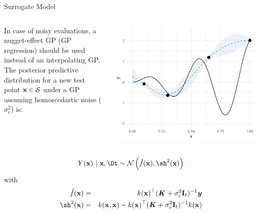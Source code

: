 \documentclass[11pt,compress,t,notes=noshow, xcolor=table]{beamer}
\begin{document}
\begin{vbframe}{Surrogate Model}

\begin{columns}[T]
\begin{column}{0.5\textwidth}
In case of noisy evaluations, a nugget-effect GP (GP regression) should be used instead of an interpolating GP.\\
\vspace{1em}
The posterior predictive distribution for a new test point $\mathbf{x} \in \mathcal{S}$ under a GP assuming homoscedastic noise ($\sigma_{\epsilon}^{2}$) is:
\end{column}
\begin{column}{0.5\textwidth}
\includegraphics[width = \textwidth]{figure_man/noisy_2.png}
\end{column}
\end{columns}

\vfill
\begin{eqnarray*}
  Y(\xv) ~|~ \xv, \Dt \sim \mathcal{N}\left(\fh(\xv), \sh^2(\xv)\right)
\end{eqnarray*}
with 
\begin{eqnarray*}
  \fh(\xv) &=& k(\xv)^\top (\bm{K} + \sigma_{\epsilon}^{2}\mathbf{I}_{t})^{-1} \bm{y} \\
  \sh^2(\xv) &=& k(\xv, \xv) - k(\xv)^\top (\bm{K} + \sigma_{\epsilon}^{2}\mathbf{I}_{t})^{-1} k(\xv)
\end{eqnarray*}

\end{vbframe}
\end{document}
